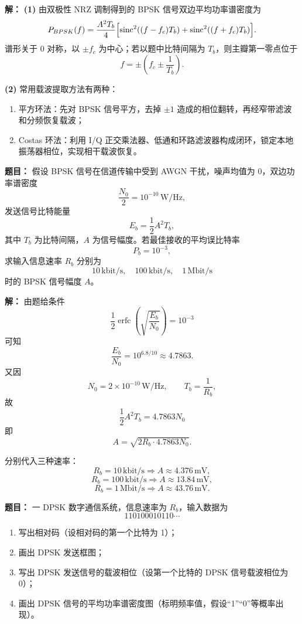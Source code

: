 \par\textbf{解：}
\textbf{(1)} 由双极性 NRZ 调制得到的 BPSK 信号双边平均功率谱密度为
\[
P_{BPSK}(f)=\frac{A^2T_b}{4}
\Bigl[
\operatorname{sinc}^2((f-f_c)T_b)+\operatorname{sinc}^2((f+f_c)T_b)
\Bigr].
\]
谱形关于 $0$ 对称，以 $\pm f_c$ 为中心；若以题中比特间隔为 $T_b$，则主瓣第一零点位于
\[
f=\pm\left(f_c\pm \frac{1}{T_b}\right).
\]

\textbf{(2)} 常用载波提取方法有两种：
\begin{enumerate}
\item 平方环法：先对 BPSK 信号平方，去掉 $\pm1$ 造成的相位翻转，再经窄带滤波和分频恢复载波；
\item Costas 环法：利用 I/Q 正交乘法器、低通和环路滤波器构成闭环，锁定本地振荡器相位，实现相干载波恢复。
\end{enumerate}

\medskip
{}
\textbf{题目：}
假设 BPSK 信号在信道传输中受到 AWGN 干扰，噪声均值为 0，双边功率谱密度
\[
\frac{N_0}{2}=10^{-10}\,\mathrm{W/Hz},
\]
发送信号比特能量
\[
E_b=\frac12A^2T_b,
\]
其中 $T_b$ 为比特间隔，$A$ 为信号幅度。若最佳接收的平均误比特率
\[
P_b=10^{-3},
\]
求输入信息速率 $R_b$ 分别为
\[
10\,\mathrm{kbit/s},\quad 100\,\mathrm{kbit/s},\quad 1\,\mathrm{Mbit/s}
\]
时的 BPSK 信号幅度 $A$。

\par\textbf{解：}
由题给条件
\[
\frac12\operatorname{erfc}\!\left(\sqrt{\frac{E_b}{N_0}}\right)=10^{-3}
\]
可知
\[
\frac{E_b}{N_0}=10^{6.8/10}\approx 4.7863.
\]
又因
\[
N_0=2\times 10^{-10}\,\mathrm{W/Hz},
\qquad
T_b=\frac1{R_b},
\]
故
\[
\frac12A^2T_b=4.7863N_0
\]
即
\[
A=\sqrt{2R_b\cdot 4.7863N_0}.
\]

分别代入三种速率：
\[
R_b=10\,\mathrm{kbit/s}\Rightarrow A\approx 4.376\,\mathrm{mV},
\]
\[
R_b=100\,\mathrm{kbit/s}\Rightarrow A\approx 13.84\,\mathrm{mV},
\]
\[
R_b=1\,\mathrm{Mbit/s}\Rightarrow A\approx 43.76\,\mathrm{mV}.
\]

\medskip
{}
\textbf{题目：}
一 DPSK 数字通信系统，信息速率为 $R_b$，输入数据为
\[
110100010110\cdots
\]
\begin{enumerate}
\item 写出相对码（设相对码的第一个比特为 1）；
\item 画出 DPSK 发送框图；
\item 写出 DPSK 发送信号的载波相位（设第一个比特的 DPSK 信号载波相位为 0）；
\item 画出 DPSK 信号的平均功率谱密度图（标明频率值，假设“1”“0”等概率出现）。
\end{enumerate}


